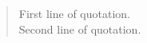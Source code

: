 \documentclass{article}
\begin{document}
\begin{quote}
  First line of quotation.\\
  Second line of quotation.\\
\end{quote}
\end{document}
